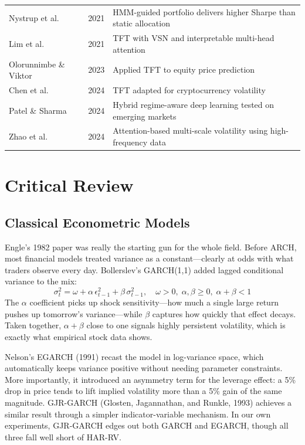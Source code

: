 \begin{table}[!t]
\begin{tabular}{p{4.2cm}cp{7.2cm}}
Nystrup et al. & 2021 & HMM-guided portfolio delivers higher Sharpe than static allocation \\
Lim et al. & 2021 & TFT with VSN and interpretable multi-head attention \\
Olorunnimbe \& Viktor & 2023 & Applied TFT to equity price prediction \\
Chen et al. & 2024 & TFT adapted for cryptocurrency volatility \\
Patel \& Sharma & 2024 & Hybrid regime-aware deep learning tested on emerging markets \\
Zhao et al. & 2024 & Attention-based multi-scale volatility using high-frequency data \\
\hline
\end{tabular}
\end{table}

\section{Critical Review}

\subsection{Classical Econometric Models}

Engle's 1982 paper was really the starting gun for the whole field. Before ARCH, most financial models treated variance as a constant---clearly at odds with what traders observe every day. Bollerslev's GARCH(1,1) added lagged conditional variance to the mix:
\begin{equation}
\sigma_t^2 = \omega + \alpha\,\epsilon_{t-1}^2 + \beta\,\sigma_{t-1}^2, \quad \omega>0,\;\alpha,\beta\geq0,\;\alpha+\beta<1
\end{equation}
The $\alpha$ coefficient picks up shock sensitivity---how much a single large return pushes up tomorrow's variance---while $\beta$ captures how quickly that effect decays. Taken together, $\alpha+\beta$ close to one signals highly persistent volatility, which is exactly what empirical stock data shows.

Nelson's EGARCH (1991) recast the model in log-variance space, which automatically keeps variance positive without needing parameter constraints. More importantly, it introduced an asymmetry term for the leverage effect: a 5\% drop in price tends to lift implied volatility more than a 5\% gain of the same magnitude. GJR-GARCH (Glosten, Jagannathan, and Runkle, 1993) achieves a similar result through a simpler indicator-variable mechanism. In our own experiments, GJR-GARCH edges out both GARCH and EGARCH, though all three fall well short of HAR-RV.


